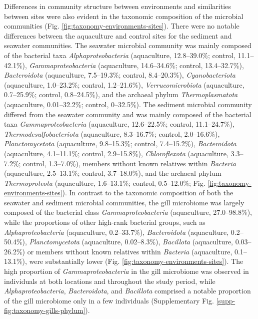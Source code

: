 \documentclass[
  12 pt,
]{article}
\begin{document}
Differences in community structure between environments and similarities between sites were also evident in the taxonomic composition of the microbial communities (Fig. \ref{fig:taxonomy-environments-sites}). There were no notable differences between the aquaculture and control sites for the sediment and seawater communities. The seawater microbial community was mainly composed of the bacterial taxa \emph{Alphaproteobacteria} (aquaculture, 12.8--39.0\unit{\percent}; control, 11.1--42.1\unit{\percent}), \emph{Gammaproteobacteria} (aquaculture, 14.6--34.6\unit{\percent}; control, 13.4--32.7\unit{\percent}), \emph{Bacteroidota} (aquaculture, 7.5--19.3\unit{\percent}; control, 8.4--20.3\unit{\percent}), \emph{Cyanobacteriota} (aquaculture, 1.0--23.2\unit{\percent}; control, 1.2--21.6\unit{\percent}), \emph{Verrucomicrobiota} (aquaculture, 0.7--25.9\unit{\percent}; control, 0.8--24.5\unit{\percent}), and the archaeal phylum \emph{Thermoplasmatota} (aquaculture, 0.01--32.2\unit{\percent}; control, 0--32.5\unit{\percent}). The sediment microbial community differed from the seawater community and was mainly composed of the bacterial taxa \emph{Gammaproteobacteria} (aquaculture, 12.6--22.5\unit{\percent}; control, 11.1--24.7\unit{\percent}), \emph{Thermodesulfobacteriota} (aquaculture, 8.3--16.7\unit{\percent}; control, 2.0--16.6\unit{\percent}), \emph{Planctomycetota} (aquaculture, 9.8--15.3\unit{\percent}; control, 7.4--15.2\unit{\percent}), \emph{Bacteroidota} (aquaculture, 4.1--11.1\unit{\percent}; control, 2.9--15.8\unit{\percent}), \emph{Chloroflexota} (aquaculture, 3.3--7.2\unit{\percent}; control, 1.3--7.0\unit{\percent}), members without known relatives within \emph{Bacteria} (aquaculture, 2.5--13.1\unit{\percent}; control, 3.7--18.0\unit{\percent}), and the archaeal phylum \emph{Thermoproteota} (aquaculture, 1.6--13.1\unit{\percent}; control, 0.5--12.0\unit{\percent}; Fig. \ref{fig:taxonomy-environments-sites}). In contrast to the taxonomic composition of both the seawater and sediment microbial communities, the gill microbiome was largely composed of the bacterial class \emph{Gammaproteobacteria} (aquaculture, 27.0--98.8\unit{\percent}), while the proportions of other high-rank bacterial groups, such as \emph{Alphaproteobacteria} (aquaculture, 0.2--33.7\unit{\percent}), \emph{Bacteroidota} (aquaculture, 0.2--50.4\unit{\percent}), \emph{Planctomycetota} (aquaculture, 0.02--8.3\unit{\percent}), \emph{Bacillota} (aquaculture, 0.03--26.2\unit{\percent}) or members without known relatives within \emph{Bacteria} (aquaculture, 0.1--13.1\unit{\percent}), were substantially lower (Fig. \ref{fig:taxonomy-environments-sites}). The high proportion of \emph{Gammaproteobacteria} in the gill microbiome was observed in individuals at both locations and throughout the study period, while \emph{Alphaproteobacteria}, \emph{Bacteroidota}, and \emph{Bacillota} comprised a notable proportion of the gill microbiome only in a few individuals (Supplementary Fig. \ref{supp-fig:taxonomy-gills-phylum}).
\end{document}
